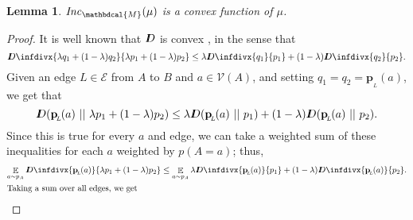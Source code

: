 \documentclass{article}
\theoremstyle{plain}
\newtheorem{lemma}[theorem]{Lemma}
\theoremstyle{definition}
\theoremstyle{remark}
\newcommand{\thickD}{I\mkern-8muD}
\newcommand{\kldiv}{\thickD\infdivx}
\DeclareMathOperator*{\E}{\mathbb{E}} %
\newcommand\mat[1]{\mathbf{#1}}
\newcommand{\bp}[1][L]{\mat{p}_{\!_{#1}\!}}
\newcommand{\Ed}{\mathcal E}
\newcommand{\dg}[1]{\mathbdcal{#1}}
\newcommand\Inc{\mathit{Inc}}
\numberwithin{equation}{section}
\begin{document}
\begin{lemma}
	\label{thm:inc-convex}
	$\Inc_{\dg M}( \mu)$ is a convex function of $\mu$.
\end{lemma}
\begin{proof}
    It is well known that $\thickD$ is convex \cite[Theorem
            2.7.2]{coverThomas}, in the sense that  
	\[ \kldiv{\lambda q_1 + (1-\lambda) q_2 }{ \lambda p_1
			  + (1-\lambda) p_2} \leq \lambda \kldiv {q_1}{ p_1} +
							(1-\lambda) \kldiv{q_2}{p_2}. \] 
Given an edge $L \in \Ed$ from $A$ to $B$ and $a \in \mathcal V(A)$,
and   
setting $q_1 = q_2 = \bp(a)$, we get that
	\[ \thickD(\bp(a) \ ||\ \lambda p_1 + (1-\lambda) p_2)
			\leq \lambda \thickD (\bp(a) \ ||\ p_1) + (1-\lambda)
							\thickD(\bp(a)\ ||\ p_2). \] 
	Since this is true for every $a$ and edge, we can take
		   a weighted sum of these inequalities for each $a$
		   weighted by $p(A=a)$; thus, 
	\begin{align*}
		\E_{a\sim p_A} \kldiv{\bp(a)}{\lambda p_1 +
			(1-\lambda) p_2} &\leq 
			 \E_{a\sim p_A}\lambda \kldiv {\bp(a)}{p_1} +
											(1-\lambda)
                         			 \kldiv{\bp(a)}{p_2}. \\
                        \intertext{Taking a sum over all edges, we get
}
\end{align*}
\end{proof}
\end{document}
